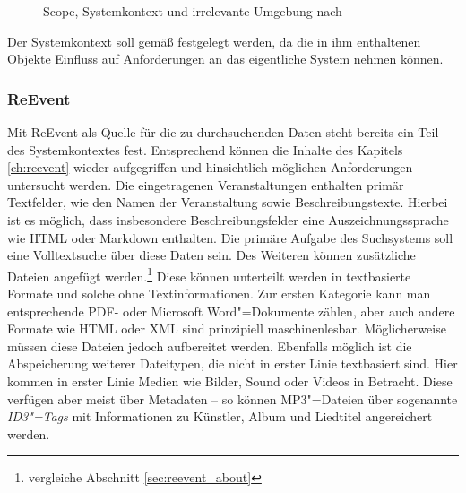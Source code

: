 \begin{figure}[ht!]
\begin{margincap}
\centering
{}
\caption[Scope, Systemkontext und irrelevante Umgebung]{Scope, Systemkontext und irrelevante Umgebung nach \cite[S. 86]{Rupp.2014}}
\label{img:systemcontext}
\end{margincap}
\end{figure}

Der Systemkontext soll gemäß \cite[S. 461]{Balzert.2009} festgelegt werden, da die in ihm enthaltenen Objekte Einfluss auf Anforderungen an das eigentliche System nehmen können.

\subsubsection{ReEvent}
\label{sec:requirements_reevent}
Mit ReEvent als Quelle für die zu durchsuchenden Daten steht bereits ein Teil des Systemkontextes fest. Entsprechend können die Inhalte des Kapitels \ref{ch:reevent} wieder aufgegriffen und hinsichtlich möglichen Anforderungen untersucht werden. Die eingetragenen Veranstaltungen enthalten primär Textfelder, wie den Namen der Veranstaltung sowie Beschreibungstexte. Hierbei ist es möglich, dass insbesondere Beschreibungsfelder eine Auszeichnungssprache wie HTML oder Markdown enthalten. Die primäre Aufgabe des Suchsystems soll eine Volltextsuche über diese Daten sein.  Des Weiteren können zusätzliche Dateien angefügt werden.\footnote{vergleiche Abschnitt \ref{sec:reevent_about}} Diese können unterteilt werden in textbasierte Formate und solche ohne Textinformationen. Zur ersten Kategorie kann man entsprechende PDF- oder Microsoft Word"=Dokumente zählen, aber auch andere Formate wie HTML oder XML sind prinzipiell maschinenlesbar. Möglicherweise müssen diese Dateien jedoch aufbereitet werden. Ebenfalls möglich ist die Abspeicherung weiterer Dateitypen, die nicht in erster Linie textbasiert sind. Hier kommen in erster Linie Medien wie Bilder, Sound oder Videos in Betracht. Diese verfügen aber meist über Metadaten -- so können MP3"=Dateien über sogenannte \emph{ID3"=Tags} mit Informationen zu Künstler, Album und Liedtitel angereichert werden.

